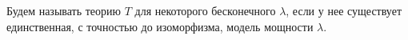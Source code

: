 Будем называть теорию $T$  для некоторого бесконечного $\lambda$, если у
нее существует единственная, с точностью до изоморфизма, модель мощности $\lambda$.